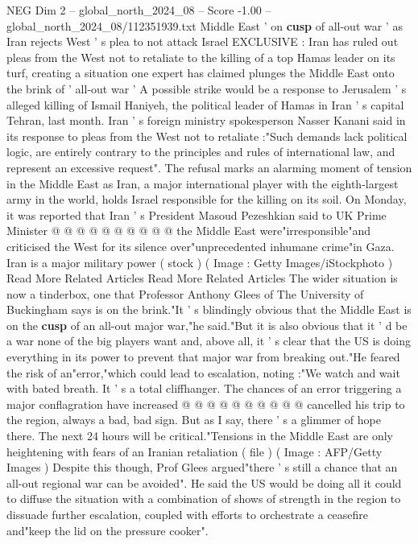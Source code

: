 \begin{textsample}{NEG Dim 2 – global\_north\_2024\_08 – Score -1.00 – global\_north\_2024\_08/112351939.txt}  \label{ex:f2_neg_052}
Middle East ' on \textbf{cusp} of all-out war ' as Iran rejects West ' s plea to not attack Israel EXCLUSIVE : Iran has ruled out pleas from the West not to retaliate to the killing of a top Hamas leader on its turf, creating a situation one expert has claimed plunges the Middle East onto the brink of ' all-out war ' A possible strike would be a response to Jerusalem ' s alleged killing of Ismail Haniyeh, the political leader of Hamas in Iran ' s capital Tehran, last month.
Iran ' s foreign ministry spokesperson Nasser Kanani said in its response to pleas from the West not to retaliate :"Such demands lack political logic, are entirely contrary to the principles and rules of international law, and represent an excessive request".
The refusal marks an alarming moment of tension in the Middle East as Iran, a major international player with the eighth-largest army in the world, holds Israel responsible for the killing on its soil.
On Monday, it was reported that Iran ' s President Masoud Pezeshkian said to UK Prime Minister @ @ @ @ @ @ @ @ @ @ the Middle East were"irresponsible"and criticised the West for its silence over"unprecedented inhumane crime"in Gaza.
Iran is a major military power ( stock ) ( Image : Getty Images/iStockphoto ) Read More Related Articles Read More Related Articles The wider situation is now a tinderbox, one that Professor Anthony Glees of The University of Buckingham says is on the brink."It ' s blindingly obvious that the Middle East is on the \textbf{cusp} of an all-out major war,"he said."But it is also obvious that it ' d be a war none of the big players want and, above all, it ' s clear that the US is doing everything in its power to prevent that major war from breaking out."He feared the risk of an"error,"which could lead to escalation, noting :"We watch and wait with bated breath.
It ' s a total cliffhanger.
The chances of an error triggering a major conflagration have increased @ @ @ @ @ @ @ @ @ @ cancelled his trip to the region, always a bad, bad sign.
But as I say, there ' s a glimmer of hope there.
The next 24 hours will be critical."Tensions in the Middle East are only heightening with fears of an Iranian retaliation ( file ) ( Image : AFP/Getty Images ) Despite this though, Prof Glees argued"there ' s still a chance that an all-out regional war can be avoided".
He said the US would be doing all it could to diffuse the situation with a combination of shows of strength in the region to dissuade further escalation, coupled with efforts to orchestrate a ceasefire and"keep the lid on the pressure cooker".

\end{textsample}

